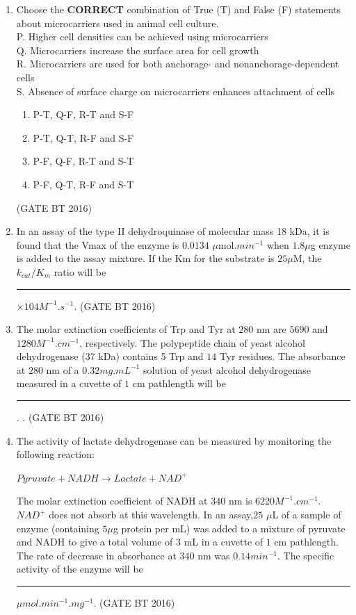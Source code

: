 \documentclass[journal,12pt,onecolumn]{IEEEtran}
\theoremstyle{remark}
\begin{document}
\begin{enumerate}
\item Choose the \textbf{CORRECT} combination of True (T) and False (F) statements about microcarriers used in animal cell culture.\\
    P. Higher cell densities can be achieved using microcarriers\\
    Q. Microcarriers increase the surface area for cell growth\\
    R. Microcarriers are used for both anchorage- and nonanchorage-dependent cells\\
    S. Absence of surface charge on microcarriers enhances attachment of cells\\
\begin{multicols}{2}
\begin{enumerate}
\item  P-T, Q-F, R-T and S-F	
\item  P-T, Q-T, R-F and S-F
\item  P-F, Q-F, R-T and S-T	
\item  P-F, Q-T, R-F and S-T
\end{enumerate}
\end{multicols} \hfill(GATE BT 2016) 

\item In an assay of the type II dehydroquinase of molecular mass 18 kDa, it is found that the Vmax of the enzyme is $0.0134$ $\mu$mol.$min^{-1}$ when $1.8 \mu$g enzyme is added to the assay mixture. If the Km for the substrate is $25 \mu$M, the $k_{cat}/K_{m}$ ratio will be\rule{2cm}{0.4pt} 	×$104 M^{-1}.s^{-1}$. \hfill(GATE BT 2016) 


\item The molar extinction coefficients of Trp and Tyr at $280$ nm are $5690$ and $1280 M^{-1}.cm^{-1}$, respectively. The polypeptide chain of yeast alcohol dehydrogenase (37 kDa) contains 5 Trp and $14$ Tyr residues. The absorbance at $280$ nm of a $0.32 mg.mL^{-1}$ solution of yeast alcohol dehydrogenase measured in a cuvette of $1$ cm pathlength will be\rule{2cm}{0.4pt} 	.
. \hfill(GATE BT 2016) 

\item The activity of lactate dehydrogenase can be measured by monitoring the following reaction:\\
\begin{center}$
Pyruvate + NADH\longrightarrow Lactate + NAD^{+}$\\
\end{center}
The molar extinction coefficient of NADH at $340$ nm is $6220 M^{-1}.cm^{-1}$. $NAD^{+}$ does not absorb at this wavelength. In an assay,$ 25$ $\mu$L of a sample of enzyme (containing $5 \mu$g protein per mL) was added to a mixture of pyruvate and NADH to give a total volume of 3 mL in a cuvette of $1$ cm pathlength. The rate of decrease in absorbance at $340$ nm was $0.14 min^{-1}$. The specific activity of the enzyme will be \rule{2cm}{0.4pt}	 $\mu mol.min^{-1}.mg^{-1}$. \hfill(GATE BT 2016) 


\end{enumerate}
\end{document}
